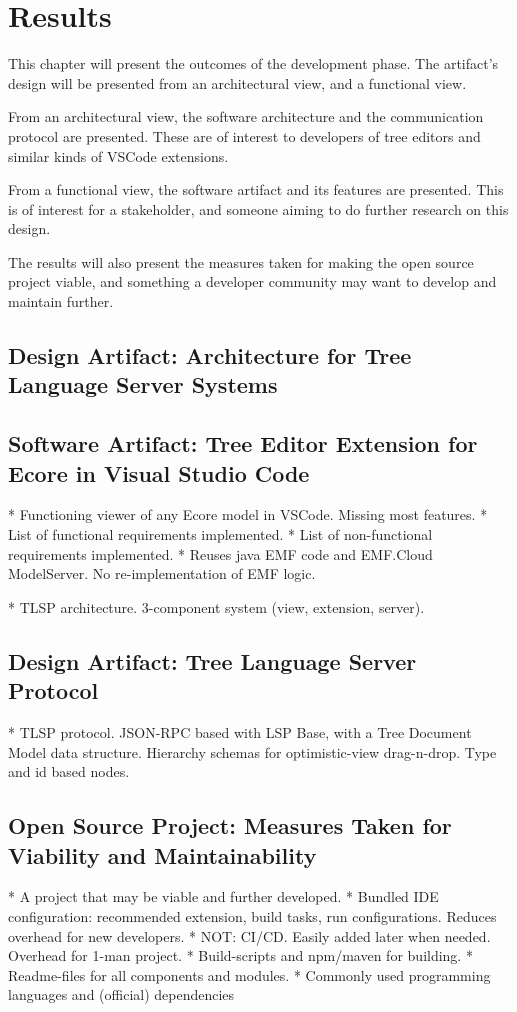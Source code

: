 \chapter{Results}\label{chap:results}

This chapter will present the outcomes of the development phase.
The artifact's design will be presented from an architectural view, and a functional view.

From an architectural view, the software architecture and the communication protocol are presented.
These are of interest to developers of tree editors and similar kinds of \gls{VSCode} extensions.

From a functional view, the software artifact and its features are presented.
This is of interest for a stakeholder, and someone aiming to do further research on this design.

The results will also present the measures taken for making the \gls{open source} project viable, and something a developer community may want to develop and maintain further.


\section{Design Artifact: Architecture for Tree Language Server Systems}




\section{Software Artifact: Tree Editor Extension for Ecore in Visual Studio Code}
* Functioning viewer of any Ecore model in VSCode. Missing most features.
  * List of functional requirements implemented.
  * List of non-functional requirements implemented.
* Reuses java EMF code and EMF.Cloud ModelServer. No re-implementation of EMF logic.

* TLSP architecture. 3-component system (view, extension, server).

\section{Design Artifact: Tree Language Server Protocol}\label{sec:tlsp}

* TLSP protocol. JSON-RPC based with LSP Base, with a Tree Document Model data structure. Hierarchy schemas for optimistic-view drag-n-drop. Type and id based nodes. 

\section{Open Source Project: Measures Taken for Viability and Maintainability}

* A project that may be viable and further developed.
  * Bundled IDE configuration: recommended extension, build tasks, run configurations. Reduces overhead for new developers.
  * NOT: CI/CD. Easily added later when needed. Overhead for 1-man project.
  * Build-scripts and npm/maven for building.
  * Readme-files for all components and modules.
  * Commonly used programming languages and (official) dependencies
  
